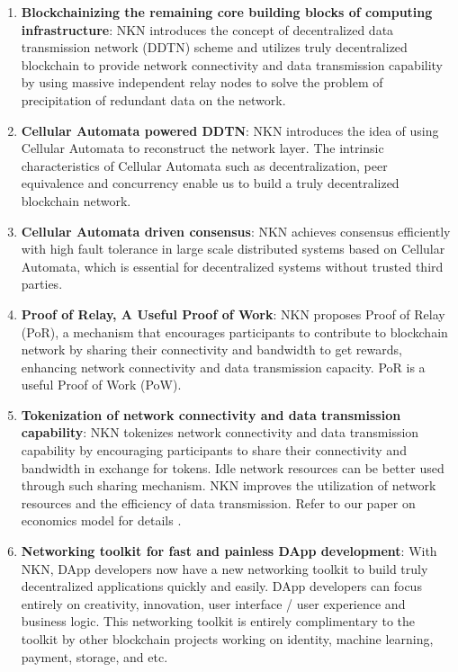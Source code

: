 \documentclass[reprint,pre,aps]{revtex4-1}
\begin{document}
\begin{enumerate}
\item \textbf{Blockchainizing the remaining core building blocks of computing infrastructure}: NKN introduces the concept of decentralized data transmission network (DDTN) scheme and utilizes truly decentralized blockchain to provide network connectivity and data transmission capability by using massive independent relay nodes to solve the problem of precipitation of redundant data on the network.
\item \textbf{Cellular Automata powered DDTN}: NKN introduces the idea of using Cellular Automata to reconstruct the network layer. The intrinsic characteristics of Cellular Automata such as decentralization, peer equivalence and concurrency enable us to build a truly decentralized blockchain network.
\item \textbf{Cellular Automata driven consensus}: NKN achieves consensus efficiently with high fault tolerance in large scale distributed systems based on Cellular Automata, which is essential for decentralized systems without trusted third parties.
\item \textbf{Proof of Relay, A Useful Proof of Work}: NKN proposes Proof of Relay (PoR), a mechanism that encourages participants to contribute to blockchain network by sharing their connectivity and bandwidth to get rewards, enhancing network connectivity and data transmission capacity. PoR is a useful Proof of Work (PoW).
\item \textbf{Tokenization of network connectivity and data transmission capability}: NKN tokenizes network connectivity and data transmission capability by encouraging participants to share their connectivity and bandwidth in exchange for tokens. Idle network resources can be better used through such sharing mechanism. NKN improves the utilization of network resources and the efficiency of data transmission. Refer to our paper on economics model for details \cite{nkn_economic_model}.
\item \textbf{Networking toolkit for fast and painless DApp development}: With NKN, DApp developers now have a new networking toolkit to build truly decentralized applications quickly and easily. DApp developers can focus entirely on creativity, innovation, user interface / user experience and business logic. This networking toolkit is entirely complimentary to the toolkit by other blockchain projects working on identity, machine learning, payment, storage, and etc. 
\end{enumerate}
\end{document}
